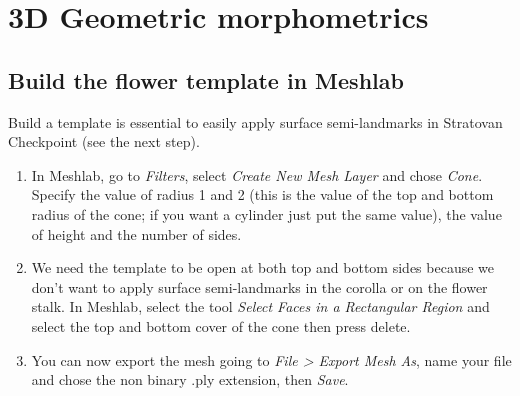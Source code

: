 \documentclass[10pt,letter,english]{article}
\begin{document}

\newpage
\section{3D Geometric morphometrics}

\subsection{Build the flower template in Meshlab}
Build a template is essential to easily apply surface semi-landmarks in Stratovan Checkpoint (see the next step).
\begin{enumerate} 
    \item In Meshlab, go to \textit{Filters}, select \textit{Create New Mesh Layer} and chose \textit{Cone}. Specify the value of radius 1 and 2 (this is the value of the top and bottom radius of the cone; if you want a cylinder just put the same value), the value of height and the number of sides.
    \item We need the template to be open at both top and bottom sides because we don't want to apply surface semi-landmarks in the corolla or on the flower stalk. In Meshlab, select the tool \textit{Select Faces in a Rectangular Region} and select the top and bottom cover of the cone then press delete. 
    \item You can now export the mesh going to \textit{File > Export Mesh As}, name your file and chose the non binary .ply extension, then \textit{Save}.
\end{enumerate}
\end{document}
